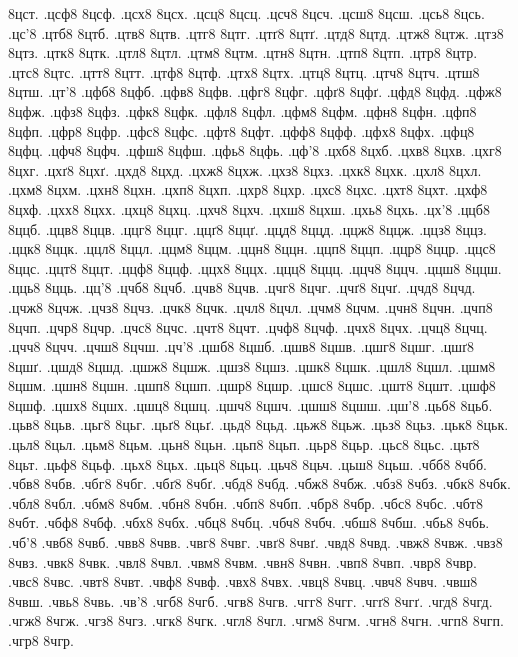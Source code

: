 {8цст.
.цсф8
8цсф.
.цсх8
8цсх.
.цсц8
8цсц.
.цсч8
8цсч.
.цсш8
8цсш.
.цсь8
8цсь.
.цс'8
.цтб8
8цтб.
.цтв8
8цтв.
.цтг8
8цтг.
.цтґ8
8цтґ.
.цтд8
8цтд.
.цтж8
8цтж.
.цтз8
8цтз.
.цтк8
8цтк.
.цтл8
8цтл.
.цтм8
8цтм.
.цтн8
8цтн.
.цтп8
8цтп.
.цтр8
8цтр.
.цтс8
8цтс.
.цтт8
8цтт.
.цтф8
8цтф.
.цтх8
8цтх.
.цтц8
8цтц.
.цтч8
8цтч.
.цтш8
8цтш.
.цт'8
.цфб8
8цфб.
.цфв8
8цфв.
.цфг8
8цфг.
.цфґ8
8цфґ.
.цфд8
8цфд.
.цфж8
8цфж.
.цфз8
8цфз.
.цфк8
8цфк.
.цфл8
8цфл.
.цфм8
8цфм.
.цфн8
8цфн.
.цфп8
8цфп.
.цфр8
8цфр.
.цфс8
8цфс.
.цфт8
8цфт.
.цфф8
8цфф.
.цфх8
8цфх.
.цфц8
8цфц.
.цфч8
8цфч.
.цфш8
8цфш.
.цфь8
8цфь.
.цф'8
.цхб8
8цхб.
.цхв8
8цхв.
.цхг8
8цхг.
.цхґ8
8цхґ.
.цхд8
8цхд.
.цхж8
8цхж.
.цхз8
8цхз.
.цхк8
8цхк.
.цхл8
8цхл.
.цхм8
8цхм.
.цхн8
8цхн.
.цхп8
8цхп.
.цхр8
8цхр.
.цхс8
8цхс.
.цхт8
8цхт.
.цхф8
8цхф.
.цхх8
8цхх.
.цхц8
8цхц.
.цхч8
8цхч.
.цхш8
8цхш.
.цхь8
8цхь.
.цх'8
.ццб8
8ццб.
.ццв8
8ццв.
.ццг8
8ццг.
.ццґ8
8ццґ.
.ццд8
8ццд.
.ццж8
8ццж.
.ццз8
8ццз.
.ццк8
8ццк.
.ццл8
8ццл.
.ццм8
8ццм.
.ццн8
8ццн.
.ццп8
8ццп.
.ццр8
8ццр.
.ццс8
8ццс.
.ццт8
8ццт.
.ццф8
8ццф.
.ццх8
8ццх.
.ццц8
8ццц.
.ццч8
8ццч.
.ццш8
8ццш.
.цць8
8цць.
.цц'8
.цчб8
8цчб.
.цчв8
8цчв.
.цчг8
8цчг.
.цчґ8
8цчґ.
.цчд8
8цчд.
.цчж8
8цчж.
.цчз8
8цчз.
.цчк8
8цчк.
.цчл8
8цчл.
.цчм8
8цчм.
.цчн8
8цчн.
.цчп8
8цчп.
.цчр8
8цчр.
.цчс8
8цчс.
.цчт8
8цчт.
.цчф8
8цчф.
.цчх8
8цчх.
.цчц8
8цчц.
.цчч8
8цчч.
.цчш8
8цчш.
.цч'8
.цшб8
8цшб.
.цшв8
8цшв.
.цшг8
8цшг.
.цшґ8
8цшґ.
.цшд8
8цшд.
.цшж8
8цшж.
.цшз8
8цшз.
.цшк8
8цшк.
.цшл8
8цшл.
.цшм8
8цшм.
.цшн8
8цшн.
.цшп8
8цшп.
.цшр8
8цшр.
.цшс8
8цшс.
.цшт8
8цшт.
.цшф8
8цшф.
.цшх8
8цшх.
.цшц8
8цшц.
.цшч8
8цшч.
.цшш8
8цшш.
.цш'8
.цьб8
8цьб.
.цьв8
8цьв.
.цьг8
8цьг.
.цьґ8
8цьґ.
.цьд8
8цьд.
.цьж8
8цьж.
.цьз8
8цьз.
.цьк8
8цьк.
.цьл8
8цьл.
.цьм8
8цьм.
.цьн8
8цьн.
.цьп8
8цьп.
.цьр8
8цьр.
.цьс8
8цьс.
.цьт8
8цьт.
.цьф8
8цьф.
.цьх8
8цьх.
.цьц8
8цьц.
.цьч8
8цьч.
.цьш8
8цьш.
.чбб8
8чбб.
.чбв8
8чбв.
.чбг8
8чбг.
.чбґ8
8чбґ.
.чбд8
8чбд.
.чбж8
8чбж.
.чбз8
8чбз.
.чбк8
8чбк.
.чбл8
8чбл.
.чбм8
8чбм.
.чбн8
8чбн.
.чбп8
8чбп.
.чбр8
8чбр.
.чбс8
8чбс.
.чбт8
8чбт.
.чбф8
8чбф.
.чбх8
8чбх.
.чбц8
8чбц.
.чбч8
8чбч.
.чбш8
8чбш.
.чбь8
8чбь.
.чб'8
.чвб8
8чвб.
.чвв8
8чвв.
.чвг8
8чвг.
.чвґ8
8чвґ.
.чвд8
8чвд.
.чвж8
8чвж.
.чвз8
8чвз.
.чвк8
8чвк.
.чвл8
8чвл.
.чвм8
8чвм.
.чвн8
8чвн.
.чвп8
8чвп.
.чвр8
8чвр.
.чвс8
8чвс.
.чвт8
8чвт.
.чвф8
8чвф.
.чвх8
8чвх.
.чвц8
8чвц.
.чвч8
8чвч.
.чвш8
8чвш.
.чвь8
8чвь.
.чв'8
.чгб8
8чгб.
.чгв8
8чгв.
.чгг8
8чгг.
.чгґ8
8чгґ.
.чгд8
8чгд.
.чгж8
8чгж.
.чгз8
8чгз.
.чгк8
8чгк.
.чгл8
8чгл.
.чгм8
8чгм.
.чгн8
8чгн.
.чгп8
8чгп.
.чгр8
8чгр.
}
